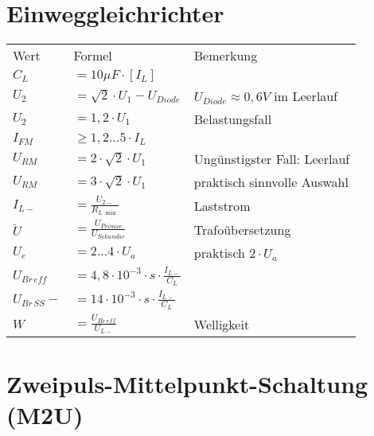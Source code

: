     \section{Einweggleichrichter}
    \label{sec:Einweggleichrichter}

    

    \begin{table}[H]
        \begin{tabularx}{\columnwidth}{l l l}
            Wert & Formel & Bemerkung \\
            $C_L$ & $=10\mu F\cdot [I_L]$ & \\
            $U_2$ & $= \sqrt{2}\cdot U_1-U_{Diode}$ & $U_{Diode}\approx 0,6V$ im Leerlauf \\
            $U_2$ & $= 1,2\cdot U_1$ & Belastungsfall \\
            $I_{FM}$ & $\geq1,2\dots 5\cdot I_L$ & \\
            $U_{RM}$ & $=2\cdot \sqrt{2}\cdot U_1$ & Ungünstigster Fall: Leerlauf \\
            $U_{RM}$ & $=3\cdot \sqrt{2}\cdot U_1$ & praktisch sinnvolle Auswahl \\
            $I_{L-}$ & $=\frac{U_{2-}}{R_{L\,\min}}$ & Laststrom \\
            $\ddot{U}$ & $=\frac{U_{Prim\ddot{a}r}}{U_{Sekund\ddot{a}r}} $ & Trafoübersetzung \\
            $U_e$ & $=2\dots 4\cdot U_a$ & praktisch $2\cdot U_a$ \\
            $U_{Br\,eff}$ & $=4,8\cdot 10^{-3}\cdot s\cdot \frac{I_{L-}}{C_L}$ & \\
            $U_{Br\,SS}-$ & $=14\cdot 10^{-3}\cdot s\cdot \frac{I_{L-}}{C_L}$ & \\
            $W$ & $=\frac{U_{Br\,eff}}{U_{L-}}$ & Welligkeit \\ %
        \end{tabularx}
    \end{table}


    \section{Zweipuls-Mittelpunkt-Schaltung (M2U)}\label{sec:zweipuls-mittelpunkt-schaltung} %

